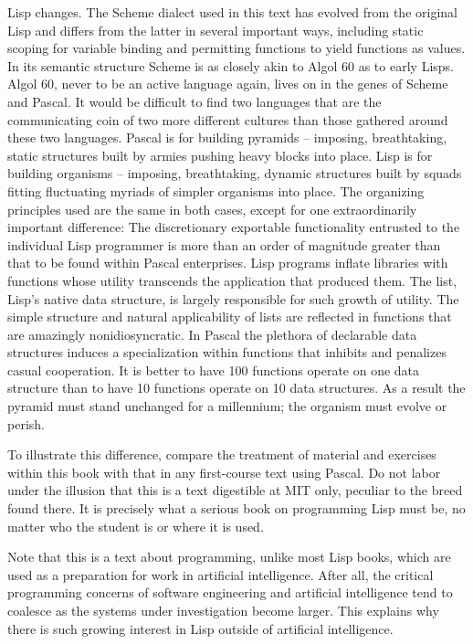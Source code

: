 Lisp changes.
The Scheme dialect used in this text has evolved from the original Lisp
and differs from the latter in several important ways,
including static scoping for variable binding and permitting functions to yield functions as values.
In its semantic structure Scheme is as closely akin to Algol 60 as to early Lisps.
Algol 60, never to be an active language again, lives on in the genes of Scheme and Pascal.
It would be difficult to find two languages that are the communicating coin of two more different cultures
than those gathered around these two languages.
Pascal is for building pyramids -- imposing, breathtaking, static structures
built by armies pushing heavy blocks into place.
Lisp is for building organisms -- imposing, breathtaking, dynamic structures
built by squads fitting fluctuating myriads of simpler organisms into place.
The organizing principles used are the same in both cases,
except for one extraordinarily important difference:
The discretionary exportable functionality entrusted to the individual Lisp programmer is more than
an order of magnitude greater than that to be found within Pascal enterprises.
Lisp programs inflate libraries with functions whose utility transcends the application that produced them.
The list, Lisp's native data structure, is largely responsible for such growth of utility.
The simple structure and natural applicability of lists are reflected in functions that are amazingly nonidiosyncratic.
In Pascal the plethora of declarable data structures induces a specialization
within functions that inhibits and penalizes casual cooperation.
It is better to have 100 functions operate on one data structure
than to have 10 functions operate on 10 data structures.
As a result the pyramid must stand unchanged for a millennium;
the organism must evolve or perish.

To illustrate this difference,
compare the treatment of material and exercises within this book
with that in any first-course text using Pascal.
Do not labor under the illusion that this is a text digestible at MIT only,
peculiar to the breed found there.
It is precisely what a serious book on programming Lisp must be,
no matter who the student is or where it is used.

Note that this is a text about programming,
unlike most Lisp books, which are used as a preparation for work in artificial intelligence.
After all, the critical programming concerns of software engineering and artificial intelligence
tend to coalesce as the systems under investigation become larger.
This explains why there is such growing interest in Lisp outside of artificial intelligence.

